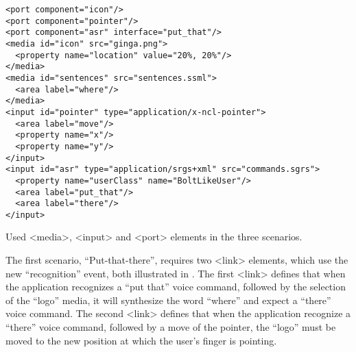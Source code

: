 \begin{verbatim}
<port component="icon"/>
<port component="pointer"/>
<port component="asr" interface="put_that"/>
<media id="icon" src="ginga.png">
  <property name="location" value="20%, 20%"/>
</media>
<media id="sentences" src="sentences.ssml">
  <area label="where"/>
</media>
<input id="pointer" type="application/x-ncl-pointer">
  <area label="move"/>
  <property name="x"/>
  <property name="y"/>
</input>
<input id="asr" type="application/srgs+xml" src="commands.sgrs">
  <property name="userClass" name="BoltLikeUser"/>
  <area label="put_that"/>
  <area label="there"/>
</input>
\end{verbatim}
\captionvspace
\begin{listing}[!ht]
\caption{Used <media>, <input> and <port> elements in the three scenarios.}
\label{list:annexb3}
\end{listing}

The first scenario, “Put-that-there”, requires two <link> elements, which use
the new “recognition” event, both illustrated in \label{list:annexb4}. The first
<link> defines that when the application recognizes a “put that” voice command,
followed by the selection of the “logo” media, it will synthesize the word
“where” and expect a “there” voice command. The second <link> defines that when
the application recognize a “there” voice command, followed by a move of the
pointer, the “logo” must be moved to the new position at which the user’s finger
is pointing.

